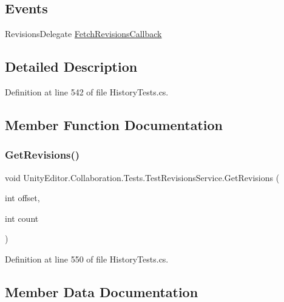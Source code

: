 \subsection*{Events}
\begin{DoxyCompactItemize}
\item 
Revisions\+Delegate \mbox{\hyperlink{class_unity_editor_1_1_collaboration_1_1_tests_1_1_test_revisions_service_a66ea2e2da006afb359655ae902e50b1d}{Fetch\+Revisions\+Callback}}
\end{DoxyCompactItemize}


\subsection{Detailed Description}


Definition at line 542 of file History\+Tests.\+cs.



\subsection{Member Function Documentation}
\mbox{\label{class_unity_editor_1_1_collaboration_1_1_tests_1_1_test_revisions_service_a0309e833c4bbd83f1e67d93042b3f38d}} 
\subsubsection{\texorpdfstring{GetRevisions()}{GetRevisions()}}
{\footnotesize\ttfamily void Unity\+Editor.\+Collaboration.\+Tests.\+Test\+Revisions\+Service.\+Get\+Revisions (\begin{DoxyParamCaption}\item[{int}]{offset,  }\item[{int}]{count }\end{DoxyParamCaption})}



Definition at line 550 of file History\+Tests.\+cs.



\subsection{Member Data Documentation}
\mbox{\label{class_unity_editor_1_1_collaboration_1_1_tests_1_1_test_revisions_service_a140775acd86fdcf454ad1c41143ad25e}} 
